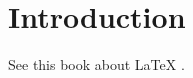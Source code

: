 \documentclass[a4paper]{article}
\begin{document}
\section{Introduction}
See this book about \LaTeX{} \parencite{companion}.

\printbibliography
\end{document}
